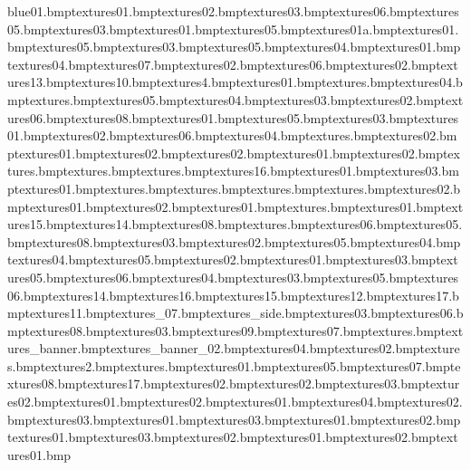 blue01.bmp textures\glasslogo01.bmp textures\glasslogo02.bmp textures\glasslogo03.bmp textures\shopdanger06.bmp textures\shopdanger05.bmp textures\shopdanger03.bmp textures\shopdanger01.bmp textures\leading05.bmp textures\voltage01a.bmp textures\shoptvstep01.bmp textures\shopbowl05.bmp textures\shopsgensign03.bmp textures\shopsgensign05.bmp textures\shopsgensign04.bmp textures\shopsgensign01.bmp textures\shopbed04.bmp textures\shopsgensign07.bmp textures\shopsgensign02.bmp textures\shopsgensign06.bmp textures\shopblackfloor02.bmp textures\chubcons13.bmp textures\ceramictile10.bmp textures\toyconnect4.bmp textures\toywall01.bmp textures\toyyosemite.bmp textures\toywall04.bmp textures\toybricks.bmp textures\racetrak05.bmp textures\racetrak04.bmp textures\racetrak03.bmp textures\racetrak02.bmp textures\racetrak06.bmp textures\racetrak08.bmp textures\glasstriple01.bmp textures\toyblox05.bmp textures\toyblox03.bmp textures\toyblox01.bmp textures\toyblox02.bmp textures\toyblox06.bmp textures\toyblox04.bmp textures\toytarget.bmp textures\toypopup02.bmp textures\toycastle01.bmp textures\toycastle02.bmp textures\woodblock02.bmp textures\woodblock01.bmp textures\jhutboard02.bmp textures\chain.bmp textures\light.bmp textures\tv.bmp textures\sportsnfl16.bmp textures\samcake01.bmp textures\signsports03.bmp textures\signtaxi01.bmp textures\samtea.bmp textures\signcereal.bmp textures\signbeans.bmp textures\martmat.bmp textures\martcheck02.bmp textures\posterfood01.bmp textures\samcan02.bmp textures\samcan01.bmp textures\samcerealboxsides.bmp textures\samcerealbox01.bmp textures\sportsnfl15.bmp textures\sportsnfl14.bmp textures\shopdough08.bmp textures\paintmanw.bmp textures\shopblackfloor06.bmp textures\shopblackfloor05.bmp textures\shopblackfloor08.bmp textures\posterfood03.bmp textures\posterfood02.bmp textures\posterfood05.bmp textures\posterfood04.bmp textures\signsmart04.bmp textures\signsmart05.bmp textures\signsmart02.bmp textures\signsmart01.bmp textures\signsmart03.bmp textures\shopdough05.bmp textures\shopdough06.bmp textures\shopdough04.bmp textures\shopdough03.bmp textures\shopbed05.bmp textures\shopbed06.bmp textures\chubcons14.bmp textures\chubcons16.bmp textures\chubcons15.bmp textures\chubcons12.bmp textures\chubcons17.bmp textures\chubcons11.bmp textures\dom_07.bmp textures\dom_side.bmp textures\shopbowl03.bmp textures\shopbowl06.bmp textures\shopbowl08.bmp textures\shopblackfloor03.bmp textures\shopbowl09.bmp textures\shopbowl07.bmp textures\blackholetex.bmp textures\depts_banner.bmp textures\depts_banner_02.bmp textures\camera04.bmp textures\tillside02.bmp textures\storeentryhandle.bmp textures\frontdoorwindow2.bmp textures\frontdoorwindow.bmp textures\glassstripe01.bmp textures\generator05.bmp textures\generator07.bmp textures\generator08.bmp textures\ceramictile17.bmp textures\generator02.bmp textures\batteryside02.bmp textures\generator03.bmp textures\robotbolt02.bmp textures\robotarm01.bmp textures\robotarm02.bmp textures\robotclaw01.bmp textures\robotclaw04.bmp textures\robotclaw02.bmp textures\robotclaw03.bmp textures\robotbolt01.bmp textures\robotface03.bmp textures\robotface01.bmp textures\robotface02.bmp textures\robotleg01.bmp textures\trolleywheel03.bmp textures\trolleywheel02.bmp textures\trolleywheel01.bmp textures\trolleymesh02.bmp textures\trolleymesh01.bmp